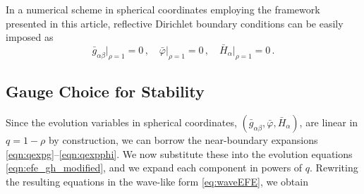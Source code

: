 \documentclass[aps,letterpaper,twocolumn,nofootinbib]{revtex4}
\numberwithin{equation}{section}
\begin{document}
In a numerical scheme in spherical coordinates employing the framework presented in this article, reflective Dirichlet boundary conditions can be easily imposed as
\begin{equation}
\label{eq:dirbc_sphcoords}
\bar{g}_{\alpha\beta}\big|_{\rho=1}=0\,,\quad \bar{\varphi}\big|_{\rho=1}=0\,,\quad \bar{H}_\alpha\big|_{\rho=1}=0\,.
 \end{equation}

\subsection{Gauge Choice for Stability}\label{sec:gau_choice_sphcoords}

Since the evolution variables in spherical coordinates, $(\bar{g}_{\alpha\beta},\bar{\varphi},\bar{H}_\alpha)$, are linear in $q=1-\rho$ by construction, we can borrow the near-boundary expansions \eqref{eqn:qexpg}--\eqref{eqn:qexpphi}. 
We now substitute these into the evolution equations \eqref{eqn:efe_gh_modified}, and we expand each component in powers of $q$. Rewriting the resulting equations in the wave-like form \eqref{eq:waveEFE}, we obtain
\end{document}
